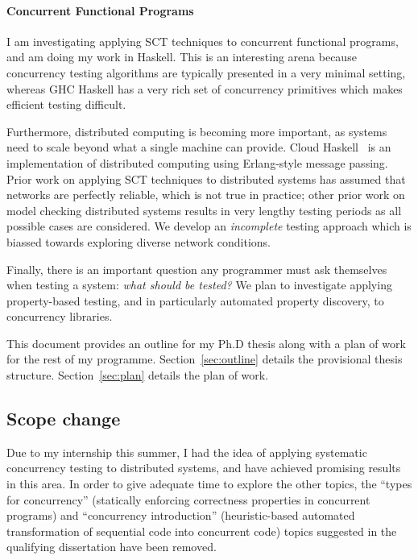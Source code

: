 \documentclass{article}
\begin{document}
\paragraph{Concurrent Functional Programs}
I am investigating applying SCT techniques to concurrent functional
programs, and am doing my work in Haskell. This is an interesting
arena because concurrency testing algorithms are typically presented
in a very minimal setting, whereas GHC Haskell has a very rich set of
concurrency primitives which makes efficient testing difficult.

Furthermore, distributed computing is becoming more important, as
systems need to scale beyond what a single machine can provide. Cloud
Haskell~\cite{epstein2011} is an implementation of distributed
computing using Erlang-style message passing. Prior work on applying
SCT techniques to distributed systems has assumed that networks are
perfectly reliable, which is not true in practice; other prior work on
model checking distributed systems results in very lengthy testing
periods as all possible cases are considered. We develop an
\emph{incomplete} testing approach which is biassed towards exploring
diverse network conditions.

Finally, there is an important question any programmer must ask
themselves when testing a system: \emph{what should be tested?} We
plan to investigate applying property-based testing, and in
particularly automated property discovery, to concurrency libraries.

This document provides an outline for my Ph.D thesis along with a plan
of work for the rest of my programme. Section~\ref{sec:outline}
details the provisional thesis structure. Section~\ref{sec:plan}
details the plan of work.

\subsection{Scope change}

Due to my internship this summer, I had the idea of applying
systematic concurrency testing to distributed systems, and have
achieved promising results in this area. In order to give adequate
time to explore the other topics, the ``types for concurrency''
(statically enforcing correctness properties in concurrent programs)
and ``concurrency introduction'' (heuristic-based automated
transformation of sequential code into concurrent code) topics
suggested in the qualifying dissertation have been removed.
\end{document}
